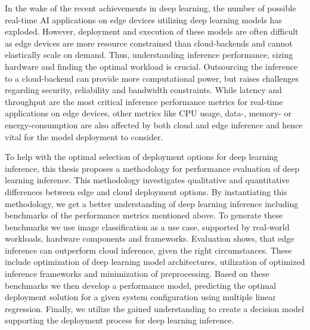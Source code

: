 \noindent In the wake of the recent achievements in deep learning, the number of possible real-time AI applications on edge devices utilizing deep learning models has exploded.
However, deployment and execution of these models are often difficult as edge devices are more resource constrained than cloud-backends and cannot elastically scale on demand.
Thus, understanding inference performance, sizing hardware and finding the optimal workload is crucial.
Outsourcing the inference to a cloud-backend can provide more computational power, but raises challenges regarding security, reliability and bandwidth constraints. 
While latency and throughput are the most critical inference performance metrics for real-time applications on edge devices, other metrics like CPU usage, data-, memory- or energy-consumption are also affected by both cloud and edge inference and hence vital for the model deployment to consider.

To help with the optimal selection of deployment options for deep learning inference, this thesis proposes a methodology for performance evaluation of deep learning inference.
This methodology investigates qualitative and quantitative differences between edge and cloud deployment options.
By instantiating this methodology, we get a better understanding of deep learning inference including benchmarks of the performance metrics mentioned above.
To generate these benchmarks we use image classification as a use case, supported by real-world workloads, hardware components and frameworks.
Evaluation shows, that edge inference can outperform cloud inference, given the right circumstances.
These include optimization of deep learning model architectures, utilization of optimized inference frameworks and minimization of preprocessing.
Based on these benchmarks we then develop a performance model, predicting the optimal deployment solution for a given system configuration using multiple linear regression.
Finally, we utilize the gained understanding to create a decision model supporting the deployment process for deep learning inference.




